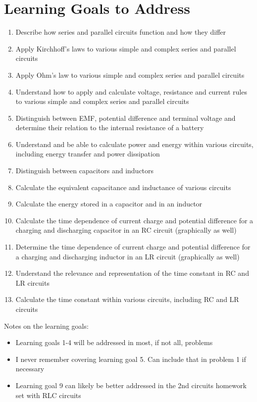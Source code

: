 \documentclass[11pt, fleqn]{article}
\begin{document}
\section*{Learning Goals to Address}
\begin{enumerate}
    \item Describe how series and parallel circuits function and how they differ 
    \item Apply Kirchhoff’s laws to various simple and complex series and parallel circuits
    \item Apply Ohm's law to various simple and complex series and parallel circuits
    \item Understand how to apply and calculate voltage, resistance and current rules to various simple and complex series and parallel circuits 
    \item Distinguish between EMF, potential difference and terminal voltage and determine their relation to the internal resistance of a battery 
    \item Understand and be able to calculate power and energy within various circuits, including energy transfer and power dissipation 
    \item Distinguish between capacitors and inductors 
    \item Calculate the equivalent capacitance and inductance of various circuits 
    \item Calculate the energy stored in a capacitor and in an inductor 
    \item Calculate the time dependence of current charge and potential difference for a charging and discharging capacitor in an RC circuit (graphically as well)
    \item Determine the time dependence of current charge and potential difference for a charging and discharging inductor in an LR circuit (graphically as well)
    \item Understand the relevance and representation of the time constant in RC and LR circuits
    \item Calculate the time constant within various circuits, including RC and LR circuits
\end{enumerate}
Notes on the learning goals:
\begin{itemize}
    \item Learning goals 1-4 will be addressed in most, if not all, problems
    \item I never remember covering learning goal 5. Can include that in problem 1 if necessary
    \item Learning goal 9 can likely be better addressed in the 2nd circuits homework set with RLC circuits
\end{itemize}
\end{document}
